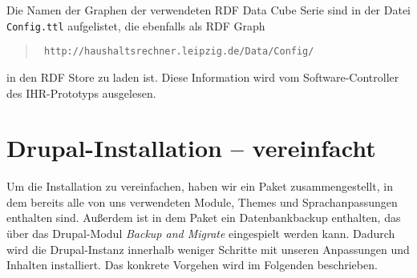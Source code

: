 \documentclass[a4paper,11pt,twoside]{article}
\begin{document}
Die Namen der Graphen der verwendeten RDF Data Cube Serie sind in der Datei
\texttt{Config.ttl} aufgelistet, die ebenfalls als RDF Graph 
\begin{quote}\tt
  http://haushaltsrechner.leipzig.de/Data/Config/
\end{quote}
in den RDF Store zu laden ist.  Diese Information wird vom Software-Controller
des IHR-Prototyps ausgelesen.

\section{Drupal-Installation -- vereinfacht}
Um die Installation zu vereinfachen, haben wir ein Paket zusammengestellt, in
dem bereits alle von uns verwendeten Module, Themes und Sprachanpassungen
enthalten sind. Außerdem ist in dem Paket ein Datenbankbackup enthalten, das
über das Drupal-Modul \emph{Backup and Migrate} eingespielt werden kann.
Dadurch wird die Drupal-Instanz innerhalb weniger Schritte mit unseren
Anpassungen und Inhalten installiert. Das konkrete Vorgehen wird im Folgenden
beschrieben.
\end{document}
